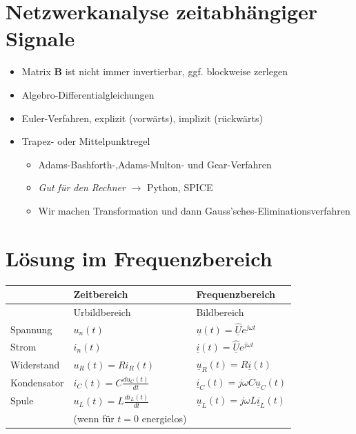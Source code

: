 \documentclass[
  ngerman,
  letterpaper,
]{scrbook}
\begin{document}
\section{Netzwerkanalyse zeitabhängiger
Signale}\label{netzwerkanalyse-zeitabhuxe4ngiger-signale}

\begin{itemize}
\item
  Matrix \(\mathbf{B}\) ist nicht immer invertierbar, ggf. blockweise
  zerlegen
\item
  Algebro-Differentialgleichungen
\item
  Euler-Verfahren, explizit (vorwärts), implizit (rückwärts)
\item
  Trapez- oder Mittelpunktregel

  \begin{itemize}
  \item
    Adams-Bashforth-,Adams-Multon- und Gear-Verfahren
  \item
    \emph{Gut für den Rechner} \(\rightarrow\) Python, SPICE
  \item
    Wir machen Transformation und dann Gauss'sches-Eliminationsverfahren
  \end{itemize}
\end{itemize}

\section{Lösung im Frequenzbereich}\label{luxf6sung-im-frequenzbereich}

\begin{longtable}[]{@{}
  >{\raggedright\arraybackslash}p{}
  >{\raggedright\arraybackslash}p{}
  >{\raggedright\arraybackslash}p{}@{}}
\toprule\noalign{}
\begin{minipage}[b]{\linewidth}\raggedright
\end{minipage} & \begin{minipage}[b]{\linewidth}\raggedright
Zeitbereich
\end{minipage} & \begin{minipage}[b]{\linewidth}\raggedright
Frequenzbereich
\end{minipage} \\
\midrule\noalign{}
\endhead
\bottomrule\noalign{}
\endlastfoot
& Urbildbereich & Bildbereich \\
Spannung & \(u_n(t)\) &
\(\underline{u}(t)=\underline{\hat{U}}e^{j\omega t}\) \\
Strom & \(i_n(t)\) &
\(\underline{i}(t)=\underline{\hat{U}}e^{j\omega t}\) \\
Widerstand & \(u_R(t)=Ri_R(t)\) &
\(\underline{u}_R(t)=R \underline{i}(t)\) \\
Kondensator & \(i_C(t)=C \frac{du_C(t)}{dt}\) &
\(\underline{i}_C(t)= j \omega C \underline{u}_C(t)\) \\
Spule & \(u_L(t)=L \frac{di_L(t)}{dt}\) &
\(\underline{u}_L(t)= j \omega L \underline{i}_L(t)\) \\
& (wenn für \(t=0\) energielos) & \\
\end{longtable}
\end{document}
